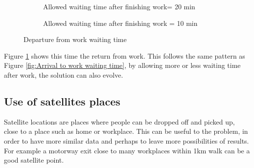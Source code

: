 \documentclass[12pt, a4paper,twoside]{memoir}
\begin{document}
	\begin{figure}[H]
		\centering
		\begin{subfigure}{.5\textwidth}
			\centering
			\caption{Allowed waiting time after finishing work= 20 min }
		\end{subfigure}%
		\begin{subfigure}{.5\textwidth}
			\centering
			\caption{Allowed waiting time after finishing work = 10 min }
		\end{subfigure}
		\caption{Departure from work waiting time}
		\label{fig:Departure from work waiting time}
	\end{figure}
	
	Figure \ref{fig:Departure from work waiting time} shows this time the return from work. This follows the same pattern as Figure \ref{fig:Arrival to work waiting time}, by allowing more or less waiting time after work, the solution can also evolve.

	\subsection*{Use of satellites places}
	
	Satellite locations are places where people can be dropped off and picked up, close to a place such as home or workplace. This can be useful to the problem, in order to have more similar data and perhaps to leave more possibilities of results. For example a motorway exit close to many workplaces within 1km walk can be a good satellite point.
	
\end{document}
